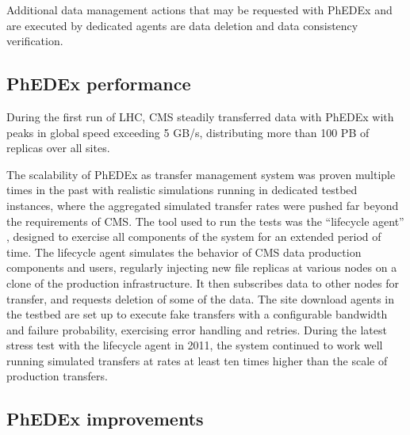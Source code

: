 Additional data management actions that may be requested with PhEDEx and are executed by dedicated agents are data deletion and data consistency verification.

\subsection{PhEDEx performance}


During the first run of LHC, CMS steadily transferred data with PhEDEx with peaks in global speed exceeding 5 GB/s, distributing more than 100 PB of replicas over all sites.


The scalability of PhEDEx as transfer management system was proven multiple times in the past with realistic simulations running in dedicated testbed instances, where the aggregated simulated transfer rates were pushed far beyond the requirements of CMS. The tool used to run the tests was the ``lifecycle agent'' \cite{lifecycle}, designed to exercise all components of the system for an extended period of time.
The lifecycle agent simulates the behavior of CMS data production components and users, regularly injecting new file replicas at various
nodes on a clone of the production infrastructure. It then subscribes data to other nodes for transfer, and requests deletion of some of the data.
The site download agents in the testbed are set up to execute fake transfers with a configurable bandwidth and failure probability, exercising error handling and retries.
During the latest stress test with the lifecycle agent in 2011, the system continued to work well running simulated transfers at rates at least ten times higher than the scale of production transfers.


\subsection{PhEDEx improvements}

